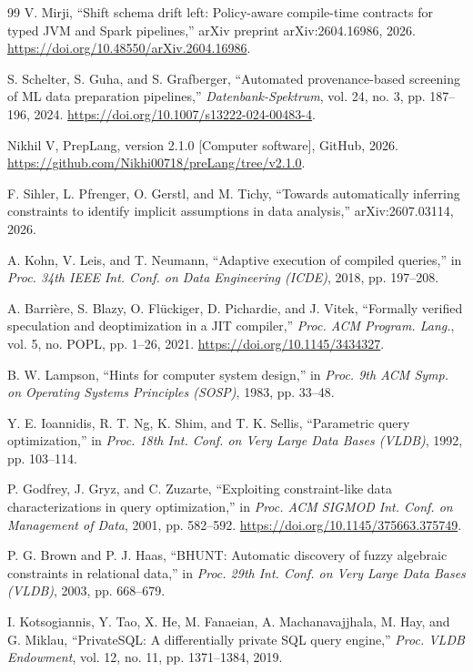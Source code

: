 \begin{thebibliography}{99}
V. Mirji, ``Shift schema drift left: Policy-aware compile-time contracts for typed JVM and Spark
pipelines,'' arXiv preprint arXiv:2604.16986, 2026.
\url{https://doi.org/10.48550/arXiv.2604.16986}.

S. Schelter, S. Guha, and S. Grafberger, ``Automated provenance-based screening of ML data preparation
pipelines,'' \emph{Datenbank-Spektrum}, vol. 24, no. 3, pp. 187--196, 2024.
\url{https://doi.org/10.1007/s13222-024-00483-4}.

Nikhil V, PrepLang, version 2.1.0 [Computer software], GitHub, 2026.
\url{https://github.com/Nikhi00718/preLang/tree/v2.1.0}.

F. Sihler, L. Pfrenger, O. Gerstl, and M. Tichy, ``Towards automatically inferring constraints to
identify implicit assumptions in data analysis,'' arXiv:2607.03114, 2026.

A. Kohn, V. Leis, and T. Neumann, ``Adaptive execution of compiled queries,'' in \emph{Proc. 34th
IEEE Int. Conf. on Data Engineering (ICDE)}, 2018, pp. 197--208.

A. Barrière, S. Blazy, O. Flückiger, D. Pichardie, and J. Vitek, ``Formally verified speculation and
deoptimization in a JIT compiler,'' \emph{Proc. ACM Program. Lang.}, vol. 5, no. POPL, pp. 1--26, 2021. \url{https://doi.org/10.1145/3434327}.

B. W. Lampson, ``Hints for computer system design,'' in \emph{Proc. 9th ACM Symp. on Operating
Systems Principles (SOSP)}, 1983, pp. 33--48.

Y. E. Ioannidis, R. T. Ng, K. Shim, and T. K. Sellis, ``Parametric query optimization,'' in
\emph{Proc. 18th Int. Conf. on Very Large Data Bases (VLDB)}, 1992, pp. 103--114.

P. Godfrey, J. Gryz, and C. Zuzarte, ``Exploiting constraint-like data characterizations in query
optimization,'' in \emph{Proc. ACM SIGMOD Int. Conf. on Management of Data}, 2001, pp. 582--592.
\url{https://doi.org/10.1145/375663.375749}.

P. G. Brown and P. J. Haas, ``BHUNT: Automatic discovery of fuzzy algebraic constraints in relational
data,'' in \emph{Proc. 29th Int. Conf. on Very Large Data Bases (VLDB)}, 2003, pp. 668--679.

I. Kotsogiannis, Y. Tao, X. He, M. Fanaeian, A. Machanavajjhala, M. Hay, and G. Miklau,
``PrivateSQL: A differentially private SQL query engine,'' \emph{Proc. VLDB Endowment}, vol. 12,
no. 11, pp. 1371--1384, 2019.


\end{thebibliography}
